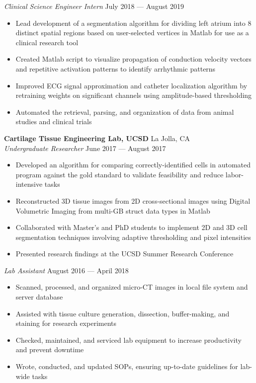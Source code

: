 \documentclass{article}
\begin{document}
\textit{Clinical Science Engineer Intern} \hfill July 2018 --- August 2019\\
\vspace{-2mm}
\begin{itemize} \itemsep 0.05pt
	\item Lead development of a segmentation algorithm for dividing left atrium into 8 distinct spatial regions based on user-selected vertices in Matlab for use as a clinical research tool
	\item Created Matlab script to visualize propagation of conduction velocity vectors and repetitive activation patterns to identify arrhythmic patterns
	\item Improved ECG signal approximation and catheter localization algorithm by retraining weights on significant channels using amplitude-based thresholding
	\item Automated the retrieval, parsing, and organization of data from animal studies and clinical trials
\end{itemize}


\textbf{Cartilage Tissue Engineering Lab, UCSD} \hfill La Jolla, CA\\
\textit{Undergraduate Researcher} \hfill June 2017 --- August 2017\\
\vspace{-2mm}
\begin{itemize} \itemsep 0.05pt
	\item Developed an algorithm for comparing correctly-identified cells in automated program against the gold standard to validate feasibility and reduce labor-intensive tasks
	\item Reconstructed 3D tissue images from 2D cross-sectional images using Digital Volumetric Imaging from multi-GB struct data types in Matlab
	\item Collaborated with Master’s and PhD students to implement 2D and 3D cell segmentation techniques involving adaptive thresholding and pixel intensities
	\item Presented research findings at the UCSD Summer Research Conference
\end{itemize}


\textit{Lab Assistant} \hfill August 2016 --- April 2018\\
\vspace{-2mm}
\begin{itemize} \itemsep 0.05pt
	\item Scanned, processed, and organized micro-CT images in local file system and server database
	\item Assisted with tissue culture generation, dissection, buffer-making, and staining for research experiments
	\item Checked, maintained, and serviced lab equipment to increase productivity and prevent downtime
	\item Wrote, conducted, and updated SOPs, ensuring up-to-date guidelines for lab-wide tasks
\end{itemize}
\end{document}
